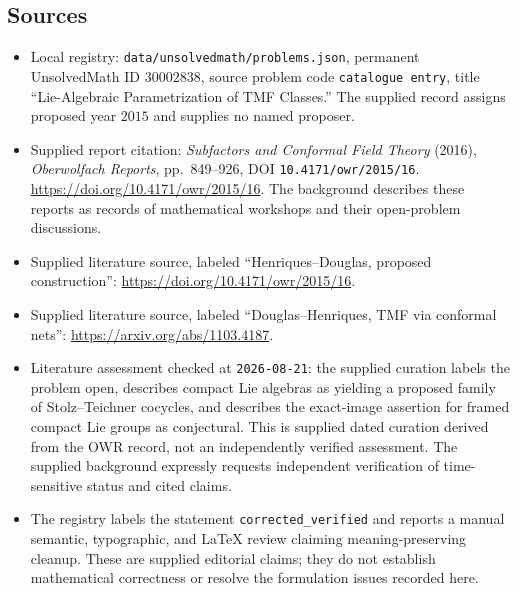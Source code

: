 \documentclass[11pt]{article}
\begin{document}
\subsection{Sources}
\begin{itemize}
\item Local registry: \texttt{data/unsolvedmath/problems.json}, permanent UnsolvedMath ID \(30002838\), source problem code \texttt{catalogue entry}, title ``Lie-Algebraic Parametrization of TMF Classes.'' The supplied record assigns proposed year \(2015\) and supplies no named proposer.
\item Supplied report citation: \emph{Subfactors and Conformal Field Theory} (2016), \emph{Oberwolfach Reports}, pp.\ 849--926, DOI \texttt{10.4171/owr/2015/16}. \url{https://doi.org/10.4171/owr/2015/16}. The background describes these reports as records of mathematical workshops and their open-problem discussions.
\item Supplied literature source, labeled ``Henriques--Douglas, proposed construction'': \url{https://doi.org/10.4171/owr/2015/16}.
\item Supplied literature source, labeled ``Douglas--Henriques, TMF via conformal nets'': \url{https://arxiv.org/abs/1103.4187}.
\item Literature assessment checked at \texttt{2026-08-21}: the supplied curation labels the problem open, describes compact Lie algebras as yielding a proposed family of Stolz--Teichner cocycles, and describes the exact-image assertion for framed compact Lie groups as conjectural. This is supplied dated curation derived from the OWR record, not an independently verified assessment. The supplied background expressly requests independent verification of time-sensitive status and cited claims.
\item The registry labels the statement \texttt{corrected\_verified} and reports a manual semantic, typographic, and LaTeX review claiming meaning-preserving cleanup. These are supplied editorial claims; they do not establish mathematical correctness or resolve the formulation issues recorded here.
\end{itemize}
\end{document}
